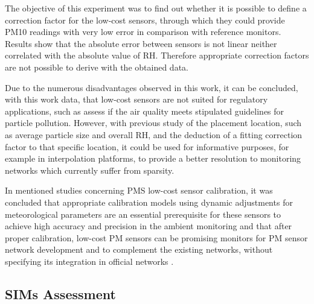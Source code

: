 The objective of this experiment was to find out whether it is possible to define a correction factor for the low-cost sensors, through which they could provide PM10 readings with very low error in comparison with reference monitors. Results show that the absolute error between sensors is not linear neither correlated with the absolute value of RH. Therefore appropriate correction factors are not possible to derive with the obtained data.

Due to the numerous disadvantages observed in this work, it can be concluded, with this work data, that low-cost sensors are not suited for regulatory applications, such as assess if the air quality meets stipulated guidelines for particle pollution. However, with previous study of the placement location, such as average particle size and overall RH, and the deduction of a fitting correction factor to that specific location, it could be used for informative purposes, for example in interpolation platforms, to provide a better resolution to monitoring networks which currently suffer from sparsity.

In mentioned studies concerning PMS low-cost sensor calibration, it was concluded that appropriate calibration models using dynamic adjustments for meteorological parameters are an essential prerequisite for these sensors to achieve high accuracy and precision in the ambient monitoring and that after proper calibration, low-cost PM sensors can be promising monitors for PM sensor network development and to complement the existing networks, without specifying its integration in official networks \cite{Zheng2018}.




\subsection{SIMs Assessment}

